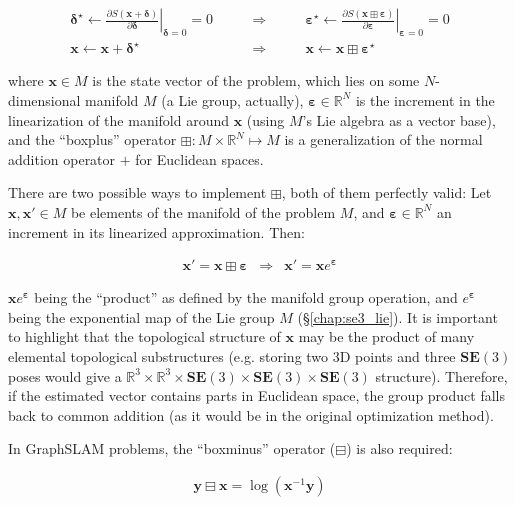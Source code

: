 \documentclass[a4paper,11pt]{report}
\newcommand{\E}{{\bm{\varepsilon}}}
\newcommand{\DEL}{{\bm{\delta}}}
\begin{document}
\begin{eqnarray}
 \DEL^\star \leftarrow
\left. \frac{\partial S(\mathbf{x} + \DEL )}{\partial \DEL }
\right|_{\DEL=0}  = 0
 &
\quad \quad \Longrightarrow \quad \quad
&
 \E^\star \leftarrow
\left. \frac{\partial S(\mathbf{x} \boxplus {\E} )}{\partial \E }
\right|_{\E=0}  = 0
\\
 \mathbf{x} \leftarrow \mathbf{x} + \DEL^\star
 &
\quad \quad \Longrightarrow \quad \quad
&
 \mathbf{x} \leftarrow \mathbf{x} \boxplus \E^\star
\end{eqnarray}

\noindent where $\mathbf{x} \in M$ is the state vector of the problem, which lies
on some $N$-dimensional manifold $M$ (a Lie group, actually),
$\E \in \mathbb{R}^N$ is the increment in the linearization of the manifold
around $\mathbf{x}$ (using $M$'s Lie algebra as a vector base),
and the ``boxplus'' operator $\boxplus: M \times \mathbb{R}^N \mapsto M$
is a generalization of the normal addition operator $+$ for Euclidean spaces. 

There are two possible ways to implement $\boxplus$, both of them perfectly valid:
Let $\mathbf{x}, \mathbf{x}' \in M$ be elements of the manifold of the problem $M$,
and $\E \in \mathbb{R}^N$ an increment in its linearized approximation.
Then:

\begin{eqnarray}
 \mathbf{x}' = \mathbf{x} \boxplus \E  & \Longrightarrow & \mathbf{x}' = \mathbf{x} e^\E 
\end{eqnarray}

\noindent $\mathbf{x} e^\E$ being the ``product'' as defined by
the manifold group operation, and $e^\E$ being the exponential map of the Lie group $M$
(\S\ref{chap:se3_lie}).
It is important to highlight that the topological structure of
$\mathbf{x}$ may be the product of many elemental topological substructures
(e.g. storing two 3D points and three $\mathbf{SE}(3)$ poses would give a
$\mathbb{R}^3 \times \mathbb{R}^3 \times \mathbf{SE}(3) \times \mathbf{SE}(3) \times \mathbf{SE}(3)$
structure). Therefore, if the estimated vector contains parts in Euclidean space, the
group product falls back to common addition
(as it would be in the original optimization method).

In GraphSLAM problems, the ``boxminus'' operator ($\boxminus$) is also required:

\begin{eqnarray}
\label{eq:boxminus}
 \mathbf{y} \boxminus \mathbf{x} = \log( \mathbf{x}^{-1} \mathbf{y} )
\end{eqnarray}
\end{document}
